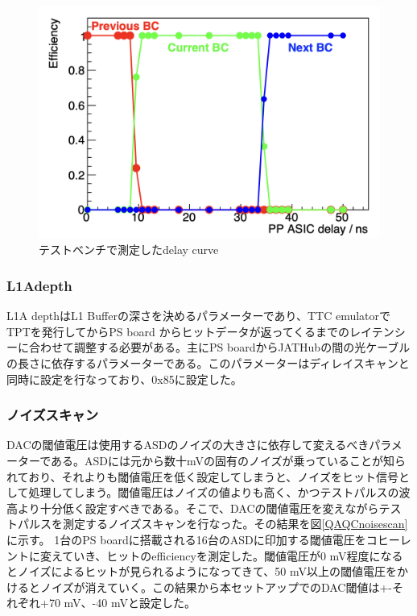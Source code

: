 \begin{figure} 
\centering
\includegraphics[width=16cm]{fig/QAQC/QAQCdelayscan.png}
\caption[ディレイカーブ]{テストベンチで測定したdelay curve}
\label{QAQCdelayscan}
\end{figure}

\subsubsection{L1Adepth}
L1A depthはL1 Bufferの深さを決めるパラメーターであり、TTC emulatorでTPTを発行してからPS board からヒットデータが返ってくるまでのレイテンシーに合わせて調整する必要がある。主にPS boardからJATHubの間の光ケーブルの長さに依存するパラメーターである。このパラメーターはディレイスキャンと同時に設定を行なっており、0x85に設定した。
\baselineskip

\subsubsection{ノイズスキャン}
DACの閾値電圧は使用するASDのノイズの大きさに依存して変えるべきパラメーターである。ASDには元から数十mVの固有のノイズが乗っていることが知られており、それよりも閾値電圧を低く設定してしまうと、ノイズをヒット信号として処理してしまう。閾値電圧はノイズの値よりも高く、かつテストパルスの波高より十分低く設定すべきである。そこで、DACの閾値電圧を変えながらテストパルスを測定するノイズスキャンを行なった。その結果を図\ref{QAQCnoisescan}に示す。
1台のPS boardに搭載される16台のASDに印加する閾値電圧をコヒーレントに変えていき、ヒットのefficiencyを測定した。閾値電圧が0 mV程度になるとノイズによるヒットが見られるようになってきて、50 mV以上の閾値電圧をかけるとノイズが消えていく。この結果から本セットアップでのDAC閾値は+-それぞれ+70 mV、-40 mVと設定した。
\baselineskip

